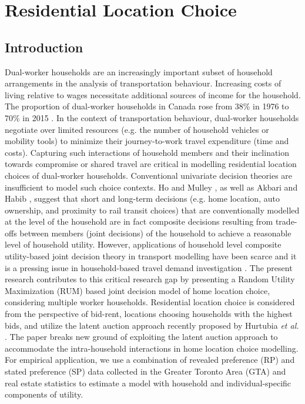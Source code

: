 \chapter{Residential Location Choice}
\section{Introduction}
Dual-worker households are an increasingly important subset of household arrangements in the analysis of transportation behaviour. Increasing costs of living relative to wages necessitate additional sources of income for the household. The proportion of dual-worker households in Canada rose from 38\% in 1976 to 70\% in 2015 \cite{StatisticsCanada2017}. In the context of transportation behaviour, dual-worker households negotiate over limited resources (e.g. the number of household vehicles or mobility tools) to minimize their journey-to-work travel expenditure (time and costs). Capturing such interactions of household members and their inclination towards compromise or shared travel are critical in modelling residential location choices of dual-worker households. Conventional univariate decision theories are insufficient to model such choice contexts. Ho and Mulley \cite{Ho2015,Ho2015a}, as well as Akbari and Habib \cite{Akbari2015}, suggest that short and long-term decisions (e.g. home location, auto ownership, and proximity to rail transit choices) that are conventionally modelled at the level of the household are in fact composite decisions resulting from trade-offs between members (joint decisions) of the household to achieve a reasonable level of household utility. However, applications of household level composite utility-based joint decision theory in transport modelling have been scarce and it is a pressing issue in household-based travel demand investigation \cite{Picard2013}. The present research contributes to this critical research gap by presenting a Random Utility Maximization (RUM) based joint decision model of home location choice, considering multiple worker households. Residential location choice is considered from the perspective of bid-rent, locations choosing households with the highest bids, and utilize the latent auction approach recently proposed by Hurtubia \emph{et al.} \cite{Hurtubia2017}. The paper breaks new ground of exploiting the latent auction approach to accommodate the intra-household interactions in home location choice modelling. For empirical application, we use a combination of revealed preference (RP) and stated preference (SP) data collected in the Greater Toronto Area (GTA) and real estate statistics to estimate a model with household and individual-specific components of utility.

